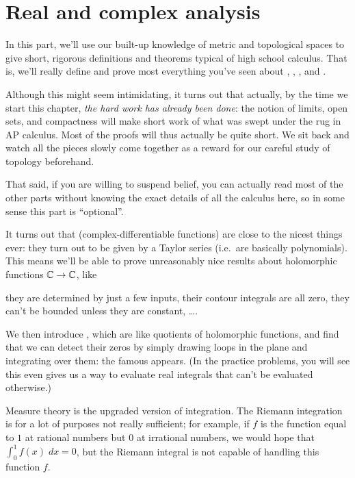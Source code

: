 \section{Real and complex analysis}
\begin{itemize}
In this part, we'll use our built-up knowledge of
metric and topological spaces to give short, rigorous definitions
and theorems typical of high school calculus.
That is, we'll really define and prove most everything you've seen about
, , , and .

Although this might seem intimidating,
it turns out that actually, by the time we start this chapter,
\emph{the hard work has already been done}:
the notion of limits, open sets, and compactness
will make short work of what was swept under the rug in AP calculus.
Most of the proofs will thus actually be quite short.
We sit back and watch all the pieces slowly come together
as a reward for our careful study of topology beforehand.

That said, if you are willing to suspend belief,
you can actually read most of the other parts
without knowing the exact details of all the calculus here,
so in some sense this part is ``optional''.

It turns out that 
(complex-differentiable functions)
are close to the nicest things ever:
they turn out to be given by a Taylor series
(i.e.\ are basically polynomials).
This means we'll be able to prove unreasonably nice results
about holomorphic functions $\mathbb C \to \mathbb C$, like
\begin{itemize}
	\ii they are determined by just a few inputs,
	\ii their contour integrals are all zero,
	\ii they can't be bounded unless they are constant,
	\ii \dots.
\end{itemize}
We then introduce ,
which are like quotients of holomorphic functions,
and find that we can detect their zeros by simply drawing
loops in the plane and integrating over them:
the famous  appears.
(In the practice problems, you will see this even gives
us a way to evaluate real integrals that can't be evaluated otherwise.)

Measure theory is the upgraded version of integration.
The Riemann integration is for a lot of purposes not really sufficient;
for example, if $f$ is the function equal to $1$ at rational numbers
but $0$ at irrational numbers,
we would hope that $\int_0^1 f(x) \; dx = 0$,
but the Riemann integral is not capable of handling this function $f$.


\end{itemize}
